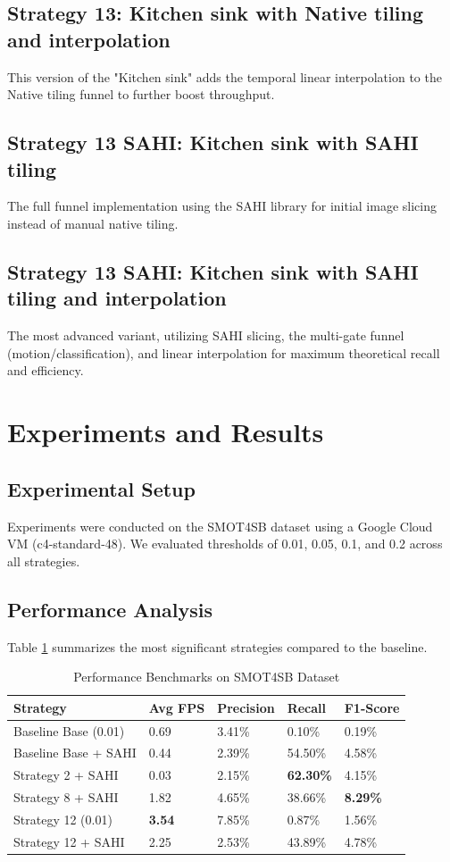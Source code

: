 \documentclass{article}
\begin{document}
\subsection{Strategy 13: Kitchen sink with Native tiling and interpolation}
This version of the "Kitchen sink" adds the temporal linear interpolation to the Native
tiling funnel to
further boost throughput.

\subsection{Strategy 13 SAHI: Kitchen sink with SAHI tiling}
The full funnel implementation using the SAHI library for initial image slicing instead
of manual native tiling.

\subsection{Strategy 13 SAHI: Kitchen sink with SAHI tiling and interpolation}
The most advanced variant, utilizing SAHI slicing, the multi-gate funnel
(motion/classification), and linear
interpolation for maximum theoretical recall and efficiency.

\section{Experiments and Results}

\subsection{Experimental Setup}
Experiments were conducted on the SMOT4SB dataset using a Google Cloud VM
(c4-standard-48). We evaluated
thresholds of 0.01, 0.05, 0.1, and 0.2 across all strategies.

\subsection{Performance Analysis}
Table \ref{results-table} summarizes the most significant strategies compared to the baseline.

\begin{table}[h]
  \caption{Performance Benchmarks on SMOT4SB Dataset}
  \label{results-table}
  \centering
  \small
  \begin{tabular}{lllll}
    \toprule
    \textbf{Strategy} & \textbf{Avg FPS} & \textbf{Precision} & \textbf{Recall} &
    \textbf{F1-Score} \\
    \midrule
    Baseline Base (0.01) & 0.69 & 3.41\% & 0.10\% & 0.19\% \\
    Baseline Base + SAHI & 0.44 & 2.39\% & 54.50\% & 4.58\% \\
    Strategy 2 + SAHI & 0.03 & 2.15\% & \textbf{62.30\%} & 4.15\% \\
    Strategy 8 + SAHI & 1.82 & 4.65\% & 38.66\% & \textbf{8.29\%} \\
    Strategy 12 (0.01) & \textbf{3.54} & 7.85\% & 0.87\% & 1.56\% \\
    Strategy 12 + SAHI & 2.25 & 2.53\% & 43.89\% & 4.78\% \\
    \bottomrule
  \end{tabular}
\end{table}
\end{document}
